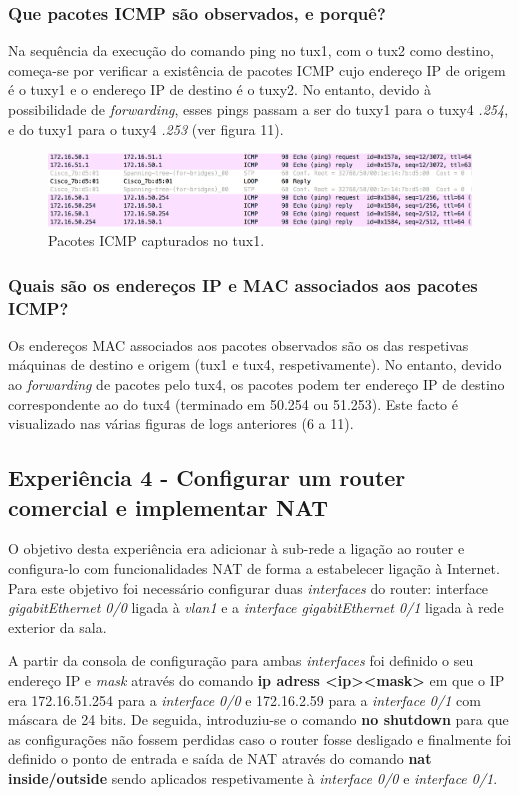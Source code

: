 \documentclass[a4paper, 11pt]{article}
\begin{document}
\subsubsection{Que pacotes ICMP são observados, e porquê?}
Na sequência da execução do comando ping no tux1, com o tux2 como destino, começa-se por verificar a existência de pacotes ICMP cujo endereço IP de origem é o tuxy1 e o endereço IP de destino é o tuxy2. No entanto, devido à possibilidade de \textit{forwarding}, esses pings passam a ser do tuxy1 para o tuxy4 \textit{.254}, e do tuxy1 para o tuxy4 \textit{.253} (ver figura 11).
\begin{figure}[h]
\centering
\includegraphics[scale=0.5]{images/Exp3_ICMP_packets_tux1.png}
\caption{Pacotes ICMP capturados no tux1.}
\label{Momentanpol}
\end{figure}

\subsubsection{Quais são os endereços IP e MAC associados aos pacotes ICMP?}
Os endereços MAC associados aos pacotes observados são os das respetivas máquinas de destino e origem (tux1 e tux4, respetivamente).
No entanto, devido ao \textit{forwarding} de pacotes pelo tux4, os pacotes podem ter endereço IP de destino correspondente ao do tux4 (terminado em 50.254 ou 51.253). Este facto é visualizado nas várias figuras de logs anteriores (6 a 11).

\subsection{Experiência 4 - Configurar um router comercial e implementar NAT}
O objetivo desta experiência era adicionar à sub-rede a ligação ao router e configura-lo com funcionalidades NAT de forma a estabelecer ligação à Internet. Para este objetivo foi necessário configurar duas \textit{interfaces} do router: interface \textit{gigabitEthernet 0/0} ligada à \textit{vlan1} e a \textit{interface gigabitEthernet 0/1} ligada à rede exterior da sala.

A partir da consola de configuração para ambas \textit{interfaces} foi definido o seu endereço IP e \textit{mask} através do comando \textbf{ip adress \textless ip\textgreater  \textless mask\textgreater} em que o IP era 172.16.51.254 para a \textit{interface 0/0} e 172.16.2.59 para a \textit{interface 0/1} com máscara de 24 bits. De seguida, introduziu-se o comando \textbf{no shutdown} para que as configurações não fossem perdidas caso o router fosse desligado e finalmente foi definido o ponto de entrada e saída de NAT através do comando \textbf{nat inside/outside} sendo aplicados respetivamente à \textit{interface 0/0} e \textit{interface 0/1}.
\end{document}
